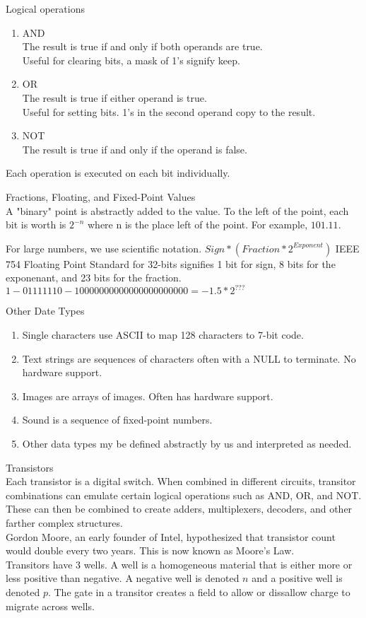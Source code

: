 \documentclass{article}
\begin{document}
\noindent
Logical operations
\begin{enumerate}
  \item {AND\\The result is true if and only if both operands are true.\\Useful for clearing bits, a mask of 1's signify keep.}
  \item {OR\\The result is true if either operand is true.\\Useful for setting bits. 1's in the second operand copy to the result.}
  \item {NOT\\The result is true if and only if the operand is false.}
\end{enumerate}
\noindent
Each operation is executed on each bit individually.

\noindent
\Large
Fractions, Floating, and Fixed-Point Values\\
\normalsize
\indent
A "binary" point is abstractly added to the value. To the left of the point, each bit is worth is $2^{-n}$ where n is the place left of the point. For example, $101.11$.

For large numbers, we use scientific notation. $Sign * (Fraction * 2^{Exponent})$
IEEE 754 Floating Point Standard for 32-bits signifies 1 bit for sign, 8 bits for the exponenant, and 23 bits for the fraction.
$1-01111110-10000000000000000000000 = -1.5*2^{???}$

\noindent
\Large
Other Date Types
\normalsize
\indent
\begin{enumerate}
  \item Single characters use ASCII to map 128 characters to 7-bit code.
  \item Text strings are sequences of characters often with a NULL to terminate. No hardware support.
  \item Images are arrays of images. Often has hardware support.
  \item Sound is a sequence of fixed-point numbers.
  \item Other data types my be defined abstractly by us and interpreted as needed.
\end{enumerate}

\noindent
\Large
Transistors\\
\normalsize
\indent
Each transistor is a digital switch. When combined in different circuits, transitor combinations can emulate certain logical operations such as AND, OR, and NOT. These can then be combined to create adders, multiplexers, decoders, and other farther complex structures.\\
Gordon Moore, an early founder of Intel, hypothesized that transistor count would double every two years. This is now known as Moore's Law.\\
Transitors have 3 wells. A well is a homogeneous material that is either more or less positive than negative. A negative well is denoted $n$ and a positive well is denoted $p$. The gate in a transitor creates a field to allow or dissallow charge to migrate across wells.
\end{document}
